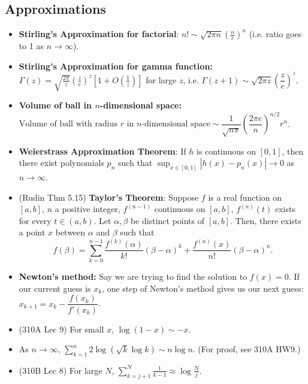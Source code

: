 \documentclass[twoside]{article}
\newcommand{\dis}{\displaystyle}
\newcommand\goesto{\rightarrow}
\begin{document}
\subsection{Approximations}
\begin{itemize}
\item \textbf{Stirling's Approximation for factorial}: $n! \sim \sqrt{2\pi n}\left(\displaystyle\frac{n}{e}\right)^n$ (i.e. ratio goes to 1 as $n \goesto \infty$).

\item \textbf{Stirling's Approximation for gamma function:} $\Gamma(z) = \dis\sqrt{\frac{2\pi}{z}}\left(\frac{z}{e} \right)^z \left[1 + O \left(\frac{1}{z}\right) \right]$ for large $z$, i.e. $\Gamma(z + 1) \sim \sqrt{2\pi z} \left(\dfrac{z}{e} \right)^z$.

\item \textbf{Volume of ball in $n$-dimensional space:} $\text{Volume of ball with radius $r$ in $n$-dimensional space} \sim \dfrac{1}{\sqrt{n\pi}}\left(\dfrac{2\pi e}{n} \right)^{n/2}r^n$.

\item \textbf{Weierstrass Approximation Theorem}: If $h$ is continuous on $[0,1]$, then there exist polynomials $p_n$ such that $\displaystyle\sup_{x \in [0,1]} |h(x) - p_n(x)| \goesto 0$ as $n \goesto \infty$.

\item (Rudin Thm 5.15) \textbf{Taylor's Theorem}: Suppose $f$ is a real function on $[a,b]$, $n$ a positive integer, $f^{(n-1)}$ continuous on $[a,b]$, $f^{(n)}(t)$ exists for every $t \in (a,b)$. Let $\alpha, \beta$ be distinct points of $[a,b]$. Then, there exists a point $x$ between $\alpha$ and $\beta$ such that
\begin{equation*}
f(\beta) = \sum_{k=0}^{n-1} \frac{f^{(k)}(\alpha)}{k!} (\beta - \alpha)^k + \frac{f^{(n)}(x)}{n!}(\beta - \alpha)^n.
\end{equation*}

\item \textbf{Newton's method:} Say we are trying to find the solution to $f(x) = 0$. If our current guess is $x_k$, one step of Newton's method gives us our next guess: $x_{k+1} = x_k - \dfrac{f(x_k)}{f'(x_k)}$.

\item (310A Lec 9) For small $x$, $\log(1 - x) \sim -x$.

\item As $n \goesto \infty$, $\dis\sum_{k=1}^n 2 \log (\sqrt{k} \log k) \sim n \log n$. (For proof, see 310A HW9.)

\item (310B Lec 8) For large $N$, $\dis\sum_{k=j+1}^N \frac{1}{k-1} \approx \log \frac{N}{j}$.

\end{itemize}
\end{document}
